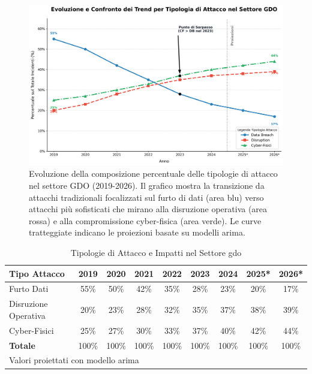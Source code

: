 \begin{figure}[htbp]
\centering
\includegraphics[width=\textwidth]{thesis_figures/cap1/evoluzione_attacchi.png}
\caption{Evoluzione della composizione percentuale delle tipologie di attacco nel settore GDO (2019-2026). Il grafico mostra la transizione da attacchi tradizionali focalizzati sul furto di dati (area blu) verso attacchi più sofisticati che mirano alla disruzione operativa (area rossa) e alla compromissione cyber-fisica (area verde). Le curve tratteggiate indicano le proiezioni basate su modelli \gls{arima}.}
\label{fig:evoluzione_attacchi}
\end{figure}

\begin{table}[htbp]
\centering
\small
\caption{Tipologie di Attacco e Impatti nel Settore \gls{gdo}}
\label{tab:threat_evolution}
\begin{tabular}{lcccccccc}
\toprule
\textbf{Tipo Attacco} & \textbf{2019} & \textbf{2020} & \textbf{2021} & \textbf{2022} & \textbf{2023} & \textbf{2024} & \textbf{2025*} & \textbf{2026*}\\
\midrule
Furto Dati & 55\% & 50\% & 42\% & 35\% & 28\% & 23\% & 20\% & 17\% \\
Disruzione Operativa & 20\% & 23\% & 28\% & 32\% & 35\% & 37\% & 38\% & 39\% \\
Cyber-Fisici & 25\% & 27\% & 30\% & 33\% & 37\% & 40\% & 42\% & 44\% \\
\midrule
\textbf{Totale} & 100\% & 100\% & 100\% & 100\% & 100\% & 100\% & 100\% & 100\% \\
\bottomrule
\multicolumn{9}{l}{\footnotesize * Valori proiettati con modello \gls{arima}}
\end{tabular}
\end{table}

